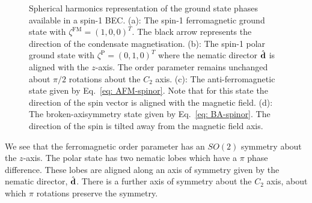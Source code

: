 \begin{figure}
    \caption[Spherical harmonic representation of spin-1 ground states]
    {\label{fig: spin-1-spherical-harmonics}
    Spherical harmonics representation of the ground state phases available in a
    spin-1 BEC.\@
    (a): The spin-1 ferromagnetic ground state with
    \(\zeta^\mathrm{FM}={(1, 0, 0)}^T\).
    The black arrow represents the direction of the condensate magnetisation.
    (b): The spin-1 polar ground state with
    \(\zeta^\mathrm{P}={(0, 1, 0)}^T\) where the nematic director
    \(\hat{\vb{d}}\) is aligned with the \(z\)-axis.
    The order parameter remains unchanged about \(\pi/2\) rotations about the
    \(C_2\) axis.
    (c): The anti-ferromagnetic state given by Eq.~\eqref{eq: AFM-spinor}.
    Note that for this state the direction of the spin vector is aligned with
    the magnetic field.
    (d): The broken-axisymmetry state given by Eq.~\eqref{eq: BA-spinor}.
    The direction of the spin is tilted away from the magnetic field axis.}
\end{figure}

We see that the ferromagnetic order parameter has an \(SO(2)\) symmetry about
the \(z\)-axis.
The polar state has two nematic lobes which have a \(\pi \) phase difference.
These lobes are aligned along an axis of symmetry given by the nematic director,
\(\hat{\vb{d}}\).
There is a further axis of symmetry about the \(C_2\) axis, about which \(\pi \)
rotations preserve the symmetry.

